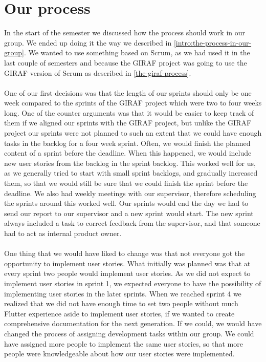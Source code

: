 \section{Our process}
In the start of the semester we discussed how the process should work in our group.
We ended up doing it the way we described in \autoref{intro:the-process-in-our-group}.
We wanted to use something based on Scrum, as we had used it in the last couple of semesters and because the GIRAF project was going to use the GIRAF version of Scrum as described in \autoref{the-giraf-process}.
\\\\
One of our first decisions was that the length of our sprints should only be one week compared to the sprints of the GIRAF project which were two to four weeks long.
One of the counter arguments was that it would be easier to keep track of them if we aligned our sprints with the GIRAF project, but unlike the GIRAF project our sprints were not planned to such an extent that we could have enough tasks in the backlog for a four week sprint.
Often, we would finish the planned content of a sprint before the deadline.
When this happened, we would include new user stories from the backlog in the sprint backlog. 
This worked well for us, as we generally tried to start with small sprint backlogs, and gradually increased them, so that we would still be sure that we could finish the sprint before the deadline.
We also had weekly meetings with our supervisor, therefore scheduling the sprints around this worked well.
Our sprints would end the day we had to send our report to our supervisor and a new sprint would start.
The new sprint always included a task to correct feedback from the supervisor, and that someone had to act as internal product owner.
\\\\
One thing that we would have liked to change was that not everyone got the opportunity to implement user stories.
What initially was planned was that at every sprint two people would implement user stories.
As we did not expect to implement user stories in sprint 1, we expected everyone to have the possibility of implementing user stories in the later sprints.
When we reached sprint 4 we realized that we did not have enough time to set two people without much Flutter experience aside to implement user stories, if we wanted to create comprehensive documentation for the next generation.
If we could, we would have changed the process of assigning development tasks within our group.
We could have assigned more people to implement the same user stories, so that more people were knowledgeable about how our user stories were implemented. 
